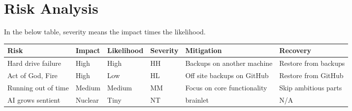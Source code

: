 \section{Risk Analysis}

In the below table, severity means the impact times the likelihood.

\begin{adjustwidth}{-7.5em}{}

\begin{center}
    \begin{tabular}{l l l l l l}
    \toprule
    Risk                & Impact    & Likelihood    & Severity      & Mitigation                    & Recovery              \\
    \midrule
    Hard drive failure  & High      & High          & HH            & Backups on another machine    & Restore from backups  \\ \addlinespace
    Act of God, Fire    & High      & Low           & HL            & Off site backups on GitHub    & Restore from GitHub   \\ \addlinespace
    Running out of time & Medium    & Medium        & MM            & Focus on core functionality   & Skip ambitious parts  \\ \addlinespace
    AI grows sentient   & Nuclear   & Tiny          & NT            & brainlet                      & N/A                   \\
    \bottomrule
    \end{tabular}
\end{center}

\end{adjustwidth}
